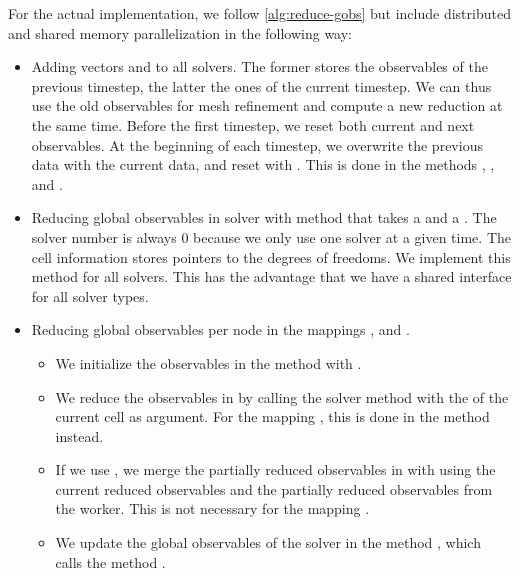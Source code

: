 For the actual implementation, we follow \cref{alg:reduce-gobs} but include distributed and shared memory parallelization in the following way:
\begin{itemize}
\item Adding vectors  and  to all solvers.
  The former stores the observables of the previous timestep, the latter the ones of the current timestep.
  We can thus use the old observables for mesh refinement and compute a new reduction at the same time.
  Before the first timestep, we reset both current and next observables.
  At the beginning of each timestep, we overwrite the previous data with the current data, and reset  with .
  This is done in the methods , ,  and .
\item Reducing global observables in solver with method  that takes a  and a .
  The solver number is always 0 because we only use one solver at a given time.
  The cell information stores pointers to the degrees of freedoms.
  We implement this method for all solvers.
  This has the advantage that we have a shared interface for all solver types.
\item Reducing global observables per node in the mappings ,  and .
  \begin{itemize}
  \item We initialize the observables in the method  with . 
  \item We reduce the observables in  by calling the solver method  with the  of the current cell as argument.
    For the mapping , this is done in the method  instead.
  \item If we use \tbb{}, we merge the partially reduced observables in  with  using the current reduced observables and the partially reduced observables from the worker.
    This is not necessary for the mapping .
   \item We update the global observables of the solver in the method , which calls the method .

\end{itemize}
\end{itemize}
